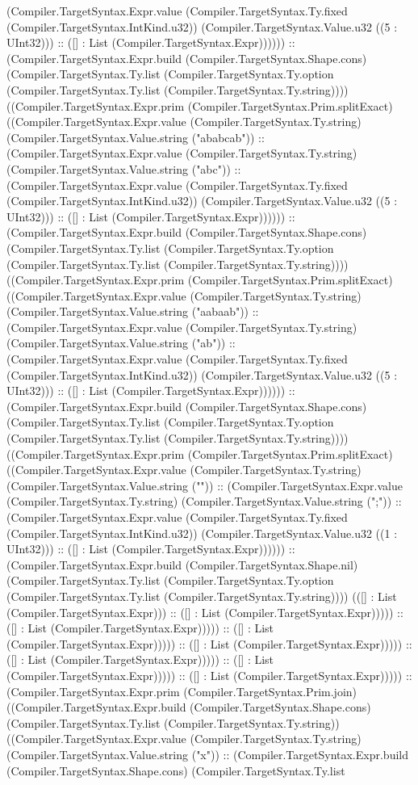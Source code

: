 \documentclass[11pt]{article}
\begin{document}
(Compiler.TargetSyntax.Expr.value (Compiler.TargetSyntax.Ty.fixed (Compiler.TargetSyntax.IntKind.u32)) (Compiler.TargetSyntax.Value.u32 ((5 : UInt32))) :: ([] : List (Compiler.TargetSyntax.Expr)))))) :: (Compiler.TargetSyntax.Expr.build (Compiler.TargetSyntax.Shape.cons) (Compiler.TargetSyntax.Ty.list (Compiler.TargetSyntax.Ty.option (Compiler.TargetSyntax.Ty.list (Compiler.TargetSyntax.Ty.string)))) ((Compiler.TargetSyntax.Expr.prim (Compiler.TargetSyntax.Prim.splitExact) ((Compiler.TargetSyntax.Expr.value (Compiler.TargetSyntax.Ty.string) (Compiler.TargetSyntax.Value.string ("ababcab")) :: (Compiler.TargetSyntax.Expr.value (Compiler.TargetSyntax.Ty.string) (Compiler.TargetSyntax.Value.string ("abc")) :: (Compiler.TargetSyntax.Expr.value (Compiler.TargetSyntax.Ty.fixed (Compiler.TargetSyntax.IntKind.u32)) (Compiler.TargetSyntax.Value.u32 ((5 : UInt32))) :: ([] : List (Compiler.TargetSyntax.Expr)))))) :: (Compiler.TargetSyntax.Expr.build (Compiler.TargetSyntax.Shape.cons) (Compiler.TargetSyntax.Ty.list (Compiler.TargetSyntax.Ty.option (Compiler.TargetSyntax.Ty.list (Compiler.TargetSyntax.Ty.string)))) ((Compiler.TargetSyntax.Expr.prim (Compiler.TargetSyntax.Prim.splitExact) ((Compiler.TargetSyntax.Expr.value (Compiler.TargetSyntax.Ty.string) (Compiler.TargetSyntax.Value.string ("aabaab")) :: (Compiler.TargetSyntax.Expr.value (Compiler.TargetSyntax.Ty.string) (Compiler.TargetSyntax.Value.string ("ab")) :: (Compiler.TargetSyntax.Expr.value (Compiler.TargetSyntax.Ty.fixed (Compiler.TargetSyntax.IntKind.u32)) (Compiler.TargetSyntax.Value.u32 ((5 : UInt32))) :: ([] : List (Compiler.TargetSyntax.Expr)))))) :: (Compiler.TargetSyntax.Expr.build (Compiler.TargetSyntax.Shape.cons) (Compiler.TargetSyntax.Ty.list (Compiler.TargetSyntax.Ty.option (Compiler.TargetSyntax.Ty.list (Compiler.TargetSyntax.Ty.string)))) ((Compiler.TargetSyntax.Expr.prim (Compiler.TargetSyntax.Prim.splitExact) ((Compiler.TargetSyntax.Expr.value (Compiler.TargetSyntax.Ty.string) (Compiler.TargetSyntax.Value.string ("")) :: (Compiler.TargetSyntax.Expr.value (Compiler.TargetSyntax.Ty.string) (Compiler.TargetSyntax.Value.string (";")) :: (Compiler.TargetSyntax.Expr.value (Compiler.TargetSyntax.Ty.fixed (Compiler.TargetSyntax.IntKind.u32)) (Compiler.TargetSyntax.Value.u32 ((1 : UInt32))) :: ([] : List (Compiler.TargetSyntax.Expr)))))) :: (Compiler.TargetSyntax.Expr.build (Compiler.TargetSyntax.Shape.nil) (Compiler.TargetSyntax.Ty.list (Compiler.TargetSyntax.Ty.option (Compiler.TargetSyntax.Ty.list (Compiler.TargetSyntax.Ty.string)))) (([] : List (Compiler.TargetSyntax.Expr))) :: ([] : List (Compiler.TargetSyntax.Expr))))) :: ([] : List (Compiler.TargetSyntax.Expr))))) :: ([] : List (Compiler.TargetSyntax.Expr))))) :: ([] : List (Compiler.TargetSyntax.Expr))))) :: ([] : List (Compiler.TargetSyntax.Expr))))) :: ([] : List (Compiler.TargetSyntax.Expr))))) :: ([] : List (Compiler.TargetSyntax.Expr))))) :: (Compiler.TargetSyntax.Expr.prim (Compiler.TargetSyntax.Prim.join) ((Compiler.TargetSyntax.Expr.build (Compiler.TargetSyntax.Shape.cons) (Compiler.TargetSyntax.Ty.list (Compiler.TargetSyntax.Ty.string)) ((Compiler.TargetSyntax.Expr.value (Compiler.TargetSyntax.Ty.string) (Compiler.TargetSyntax.Value.string ("x")) :: (Compiler.TargetSyntax.Expr.build (Compiler.TargetSyntax.Shape.cons) (Compiler.TargetSyntax.Ty.list 
\end{document}
